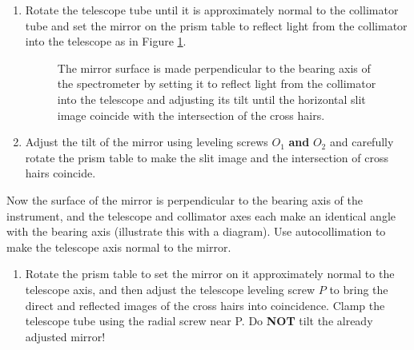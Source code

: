\documentclass[12pt]{article}
\begin{document}
\begin{enumerate}[resume]
    \item Rotate the telescope tube until it is approximately normal to the collimator tube and set the mirror on the prism table to reflect light from the collimator into the telescope as in Figure \ref{Telescope normal to collimator}.

\begin{figure}[ht!]
    \centering
    \caption{The mirror surface is made perpendicular to the bearing axis of the spectrometer by setting it to reflect light from the collimator into the telescope and adjusting its tilt until the horizontal slit image coincide with the intersection of the cross hairs.}
    \label{Telescope normal to collimator}
\end{figure}
    
    \item Adjust the tilt of the mirror using leveling screws $O_1$ \textbf{and} $O_2$ and carefully rotate the prism table to make the slit image and the intersection of cross hairs coincide.
\end{enumerate}
Now the surface of the mirror is perpendicular to the bearing axis of the instrument, and the telescope and collimator axes each make an identical angle with the bearing axis (illustrate this with a diagram). Use autocollimation to make the telescope axis normal to the mirror.
\begin{enumerate}[resume]
    \item Rotate the prism table to set the mirror on it approximately normal to the telescope axis, and then adjust the telescope leveling screw $P$ to bring the direct and reflected images of the cross hairs into coincidence. Clamp the telescope tube using the radial screw near P. Do \textbf{NOT} tilt the already adjusted mirror!
\end{enumerate}
\end{document}
